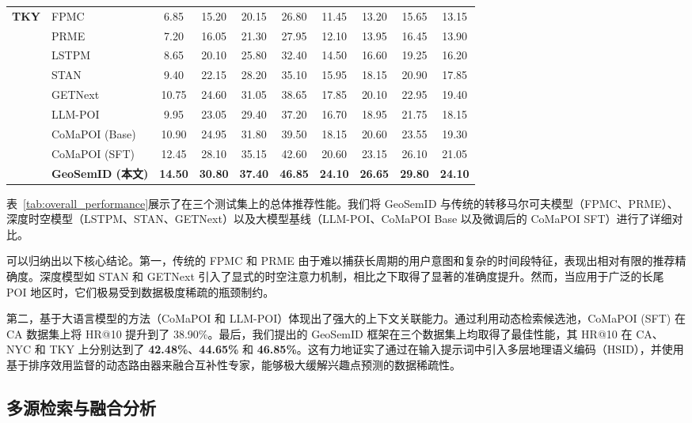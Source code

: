 \documentclass[10pt,fontset=none,twocolumn]{ctexart}
\begin{document}
\begin{table}[!t]
{\begin{tabular}{llcccccccc}
\textbf{TKY} & FPMC & 6.85 & 15.20 & 20.15 & 26.80 & 11.45 & 13.20 & 15.65 & 13.15 \\
& PRME & 7.20 & 16.05 & 21.30 & 27.95 & 12.10 & 13.95 & 16.45 & 13.90 \\
& LSTPM & 8.65 & 20.10 & 25.80 & 32.40 & 14.50 & 16.60 & 19.25 & 16.20 \\
& STAN & 9.40 & 22.15 & 28.20 & 35.10 & 15.95 & 18.15 & 20.90 & 17.85 \\
& GETNext & 10.75 & 24.60 & 31.05 & 38.65 & 17.85 & 20.10 & 22.95 & 19.40 \\
& LLM-POI & 9.95 & 23.05 & 29.40 & 37.20 & 16.70 & 18.95 & 21.75 & 18.15 \\
& CoMaPOI (Base) & 10.90 & 24.95 & 31.80 & 39.50 & 18.15 & 20.60 & 23.55 & 19.30 \\
& CoMaPOI (SFT) & 12.45 & 28.10 & 35.15 & 42.60 & 20.60 & 23.15 & 26.10 & 21.05 \\
& \textbf{GeoSemID (本文)} & \textbf{14.50} & \textbf{30.80} & \textbf{37.40} & \textbf{46.85} & \textbf{24.10} & \textbf{26.65} & \textbf{29.80} & \textbf{24.10} \\ \bottomrule
\end{tabular}%
}
\end{table}

表~\ref{tab:overall_performance}展示了在三个测试集上的总体推荐性能。我们将 GeoSemID 与传统的转移马尔可夫模型（FPMC、PRME）、深度时空模型（LSTPM、STAN、GETNext）以及大模型基线（LLM-POI、CoMaPOI Base 以及微调后的 CoMaPOI SFT）进行了详细对比。

可以归纳出以下核心结论。第一，传统的 FPMC 和 PRME 由于难以捕获长周期的用户意图和复杂的时间段特征，表现出相对有限的推荐精确度。深度模型如 STAN 和 GETNext 引入了显式的时空注意力机制，相比之下取得了显著的准确度提升。然而，当应用于广泛的长尾 POI 地区时，它们极易受到数据极度稀疏的瓶颈制约。

第二，基于大语言模型的方法（CoMaPOI 和 LLM-POI）体现出了强大的上下文关联能力。通过利用动态检索候选池，CoMaPOI (SFT) 在 CA 数据集上将 HR@10 提升到了 38.90\%。最后，我们提出的 GeoSemID 框架在三个数据集上均取得了最佳性能，其 HR@10 在 CA、NYC 和 TKY 上分别达到了 \textbf{42.48\%}、\textbf{44.65\%} 和 \textbf{46.85\%}。这有力地证实了通过在输入提示词中引入多层地理语义编码（HSID），并使用基于排序效用监督的动态路由器来融合互补性专家，能够极大缓解兴趣点预测的数据稀疏性。

\subsection{多源检索与融合分析}
\end{document}
